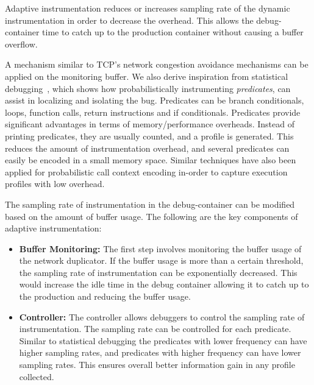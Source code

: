 Adaptive instrumentation reduces or increases sampling rate of the dynamic instrumentation in order to decrease the overhead. 
This allows the debug-container time to catch up to the production container without causing a buffer overflow.


A mechanism similar to TCP's network congestion avoidance mechanisms can be applied on the monitoring buffer.
We also derive inspiration from statistical debugging~\cite{statisticalPerformance,holmes,statisticalDebugging}, which shows how probabilistically instrumenting \emph{predicates}, can assist in localizing and isolating the bug. 
Predicates can be branch conditionals, loops, function calls, return instructions and if conditionals.
Predicates provide significant advantages in terms of memory/performance overheads.
Instead of printing predicates, they are usually counted, and a profile is generated.
This reduces the amount of instrumentation overhead, and several predicates can easily be encoded in a small memory space.
Similar techniques have also been applied for probabilistic call context encoding in-order to capture execution profiles with low overhead.


The sampling rate of instrumentation in the debug-container can be modified based on the amount of buffer usage.
The following are the key components of adaptive instrumentation:

\begin{itemize}
	\item \textbf{Buffer Monitoring:}
	The first step involves monitoring the buffer usage of the network duplicator. 
	If the buffer usage is more than a certain threshold, the sampling rate of instrumentation can be exponentially decreased.
	This would increase the idle time in the debug container allowing it to catch up to the production and reducing the buffer usage.
	
	\item \textbf{Controller:}
	The controller allows debuggers to control the sampling rate of instrumentation.
	The sampling rate can be controlled for each predicate.
	Similar to statistical debugging the predicates with lower frequency can have higher sampling rates, and predicates with higher frequency can have lower sampling rates. This ensures overall better information gain in any profile collected.  	
	
\end{itemize}

